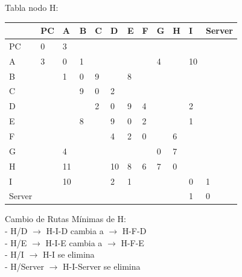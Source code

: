 \documentclass[a4paper]{article}
\begin{document}
\begin{table}[h]
Tabla nodo H:\\
\begin{tabular}{|l|l|l|l|l|l|l|l|l|l|l|l|}
\hline
       & PC & A  & B & C & D  & E & F & G & H & I  & Server \\ \hline
PC     & 0  & 3  &   &   &    &   &   &   &   &    &        \\ \hline
A      & 3  & 0  & 1 &   &    &   &   & 4 &   & 10 &        \\ \hline
B      &    & 1  & 0 & 9 &    & 8 &   &   &   &    &        \\ \hline
C      &    &    & 9 & 0 & 2  &   &   &   &   &    &        \\ \hline
D      &    &    &   & 2 & 0  & 9 & 4 &   &   & 2  &        \\ \hline
E      &    &    & 8 &   & 9  & 0 & 2 &   &   & 1  &        \\ \hline
F      &    &    &   &   & 4  & 2 & 0 &   & 6 &    &        \\ \hline
G      &    & 4  &   &   &    &   &   & 0 & 7 &    &        \\ \hline
H      &    & 11 &   &   & 10 & 8 & 6 & 7 & 0 &    &        \\ \hline
I      &    & 10 &   &   & 2  & 1 &   &   &   & 0  & 1      \\ \hline
Server &    &    &   &   &    &   &   &   &   & 1  & 0      \\ \hline
\end{tabular}

Cambio de Rutas Mínimas de H:\\
-	H/D  $\rightarrow$  H-I-D  cambia a $\rightarrow$   H-F-D\\
-	H/E  $\rightarrow$  H-I-E  cambia a $\rightarrow$   H-F-E\\
-	H/I  $\rightarrow$  H-I  se elimina\\
-	H/Server  $\rightarrow$  H-I-Server	  se elimina\\


\end{table}
\clearpage
\end{document}
